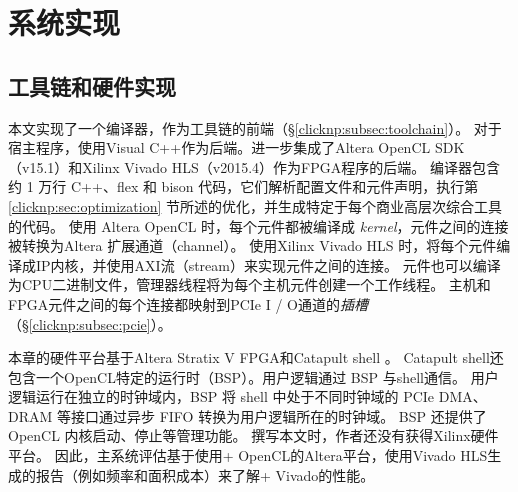 \section{系统实现}
\label{clicknp:sec:impl}

\subsection{\name 工具链和硬件实现}

本文实现了一个\name 编译器，作为\name 工具链的前端（\S \ref {clicknp:subsec:toolchain}）。
对于宿主程序，使用Visual C++作为后端。进一步集成了Altera OpenCL SDK（v15.1）\cite {aoc}和Xilinx Vivado HLS（v2015.4）\cite {vivado}作为FPGA程序的后端。
\name 编译器包含约 1 万行 C++、flex 和 bison 代码，它们解析配置文件和元件声明，执行第 \ref {clicknp:sec:optimization} 节所述的优化，并生成特定于每个商业高层次综合工具的代码。
使用 Altera OpenCL 时，每个\name 元件都被编译成 \textit {kernel}，元件之间的连接被转换为Altera 扩展通道（channel）。
使用Xilinx Vivado HLS 时，将每个元件编译成IP内核，并使用AXI流（stream）来实现元件之间的连接。
元件也可以编译为CPU二进制文件，管理器线程将为每个主机元件创建一个工作线程。
主机和FPGA元件之间的每个连接都映射到PCIe I / O通道的\textit {插槽}（\S \ref {clicknp:subsec:pcie}）。


本章的硬件平台基于Altera Stratix V FPGA和Catapult shell \cite {putnam2014reconfigurable}。
Catapult shell还包含一个OpenCL特定的运行时（BSP）。\name 用户逻辑通过 BSP 与shell通信。
\name 用户逻辑运行在独立的时钟域内，BSP 将 shell 中处于不同时钟域的 PCIe DMA、DRAM 等接口通过异步 FIFO 转换为用户逻辑所在的时钟域。
BSP 还提供了 OpenCL 内核启动、停止等管理功能。
撰写本文时，作者还没有获得Xilinx硬件平台。
因此，主系统评估基于使用\name + OpenCL的Altera平台，使用Vivado HLS生成的报告（例如频率和面积成本）来了解\name + Vivado的性能。

